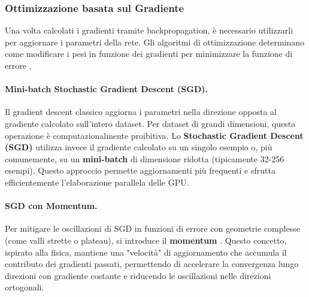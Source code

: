 \begin{table}[h]
\caption{Funzioni di errore per diversi tipi di problema.}
\centering
{}

\label{tab:loss_functions}
\end{table}


\subsubsection{Ottimizzazione basata sul Gradiente}

Una volta calcolati i gradienti tramite backpropagation, è necessario utilizzarli per aggiornare i parametri della rete. Gli algoritmi di ottimizzazione determinano come modificare i pesi in funzione dei gradienti per minimizzare la funzione di errore \cite{goodfellow2016deep}.


\paragraph{Mini-batch Stochastic Gradient Descent (SGD).}
Il gradient descent classico \cite{bishop2006pattern} aggiorna i parametri nella direzione opposta al gradiente calcolato sull'intero dataset. Per dataset di grandi dimensioni, questa operazione è computazionalmente proibitiva. Lo \textbf{Stochastic Gradient Descent (SGD)} \cite{bottou2010large} utilizza invece il gradiente calcolato su un singolo esempio o, più comunemente, su un \textbf{mini-batch} di dimensione ridotta (tipicamente 32-256 esempi). Questo approccio permette aggiornamenti più frequenti e sfrutta efficientemente l'elaborazione parallela delle GPU.

\paragraph{SGD con Momentum.}
Per mitigare le oscillazioni di SGD in funzioni di errore con geometrie complesse (come valli strette o plateau), si introduce il \textbf{momentum} \cite{polyak1964some, sutskever2013importance}. Questo concetto, ispirato alla fisica, mantiene una "velocità" di aggiornamento che accumula il contributo dei gradienti passati, permettendo di accelerare la convergenza lungo direzioni con gradiente costante e riducendo le oscillazioni nelle direzioni ortogonali.

